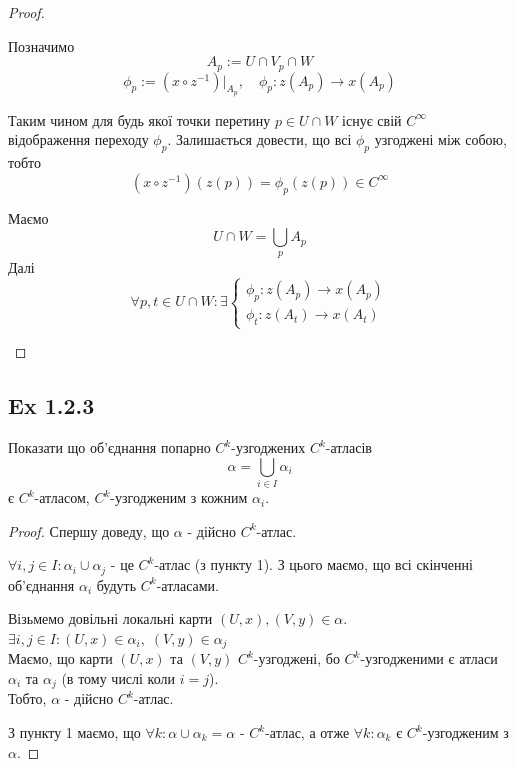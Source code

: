 \documentclass[10pt, a4paper]{article} %
\begin{document}
\begin{proof}
\begin{itemize}
        Позначимо 
        \[A_p := U\cap V_p\cap W\]
        \[\phi_p := \left(x \circ z^{-1}\right)|_{A_p}, \quad \phi_p : z(A_p) \to x(A_p) \]
        
        Таким чином для будь якої точки перетину $p\in U\cap W$ існує свій $C^\infty$ відображення переходу $\phi_p$.
        Залишається довести, що всі $\phi_p$ узгоджені між собою, тобто
        \[\left(x \circ z^{-1}\right)(z(p)) = \phi_p(z(p)) \in C^{\infty}\]

        Маємо
        \[U\cap W = \bigcup_p A_p\]
        Далі
        \[\forall p,t \in U \cap W: \exists \begin{cases}
            \phi_p : z(A_p) \to x(A_p)\\
            \phi_t : z(A_t) \to x(A_t)
        \end{cases}\]

    \end{itemize}
\end{proof}

\subsection*{Ex 1.2.3}
\begin{mdframed}
    Показати що об'єднання попарно $C^k$-узгоджених $C^k$-атласів 
    \[\alpha = \bigcup_{i\in I} \alpha_i\] 
    є $C^k$-атласом, $C^k$-узгодженим з кожним $\alpha_i$.
\end{mdframed}

\begin{proof}
    
Спершу доведу, що $\alpha$ - дійсно $C^k$-атлас.

$\forall i,j\in I: \alpha_i \cup \alpha_j$ - це $C^k$-атлас (з пункту 1). З цього маємо, що всі скінченні об'єднання $\alpha_i$ будуть $C^k$-атласами.

Візьмемо довільні локальні карти $(U,x), (V,y) \in \alpha$.\\
$\exists i,j\in I: (U,x) \in \alpha_i, \; (V,y)\in\alpha_j$\\
Маємо, що карти $(U,x)$ та $(V,y)$ $C^k$-узгоджені, бо $C^k$-узгодженими є атласи $\alpha_i$ та $\alpha_j$ (в тому числі коли $i=j$).\\
Тобто, $\alpha$ - дійсно $C^k$-атлас.

З пункту 1 маємо, що $\forall k: \alpha \cup \alpha_k = \alpha$ - $C^k$-атлас, а отже $\forall k: \alpha_k$ є $C^k$-узгодженим з $\alpha$.

\end{proof}
\end{document}
